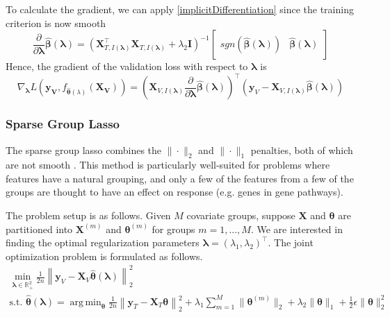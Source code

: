 \documentclass{statsoc}
\DeclareMathOperator*{\argmin}{arg\,min}
\begin{document}
To calculate the gradient, we can apply \eqref{implicitDifferentiation} since the training criterion is now smooth
\begin{equation}
\frac{\partial}{\partial \boldsymbol \lambda} \hat{\boldsymbol{\beta}}(\boldsymbol{\lambda}) = 
\left ( 
\boldsymbol{X}_{T, I(\boldsymbol\lambda)}^\top \boldsymbol{X}_{T, I(\boldsymbol\lambda)} + \lambda_2 \boldsymbol{I}
\right )^{-1}
\begin{bmatrix}
sgn \left (\hat{\boldsymbol{\beta}} (\boldsymbol{\lambda}) \right ) &
\hat{\boldsymbol{\beta}} (\boldsymbol{\lambda})
\end{bmatrix}
\end{equation}
Hence, the gradient of the validation loss with respect to $\boldsymbol{\lambda}$ is
\begin{equation}
\nabla_{\boldsymbol \lambda} L(\boldsymbol{y_V}, f_{\hat{\boldsymbol{\theta}}(\lambda)}(\boldsymbol{X_V})) =
\left (
\boldsymbol{X}_{V, I(\boldsymbol\lambda)}
\frac{\partial}{\partial \boldsymbol \lambda} \hat{\boldsymbol{\beta}}(\boldsymbol{\lambda})
\right )^{\top}
\left (
\boldsymbol y_V - \boldsymbol{X}_{V, I(\boldsymbol\lambda)} \hat{\boldsymbol{\beta}} (\boldsymbol{\lambda})
\right )
\end{equation}

\subsubsection{Sparse Group Lasso}\label{sec:sgl}

The sparse group lasso combines the $\|\cdot\|_2$ and $\|\cdot\|_1$ penalties, both of which are not smooth \citep{simon2013sparse}. This method is particularly well-suited for problems where features have a natural grouping, and only a few of the features from a few of the groups are thought to have an effect on response (e.g. genes in gene pathways).

The problem setup is as follows. Given $M$ covariate groups, suppose $\boldsymbol{X}$ and $\boldsymbol \theta$ are partitioned into $\boldsymbol{X}^{(m)}$ and $\boldsymbol \theta^{(m)}$ for groups $m = 1, ... , M$. We are interested in finding the optimal regularization parameters $\boldsymbol{\lambda} = (\lambda_1, \lambda_2)^\top$. The joint optimization problem is formulated as follows.
\begin{equation}
\begin{array}{c}
\min_{\boldsymbol{\lambda} \in \mathbb{R}^2_{+}} \frac{1}{2n}
\left \| \boldsymbol{y}_V - \boldsymbol{X}_V \hat{\boldsymbol{\theta}}(\boldsymbol{\lambda}) \right \|^2_2 \\
\text{s.t. }
\hat{\boldsymbol{\theta}}(\boldsymbol{\lambda}) =
\argmin_{\boldsymbol{\theta}} \frac{1}{2n} 
\left \| \boldsymbol{y}_T - \boldsymbol{X}_T \boldsymbol{\theta} \right \|^2_2
+ \lambda_1 \sum_{m=1}^M \| \boldsymbol\theta^{(m)} \|_2
+ \lambda_2 \| \boldsymbol\theta \|_1
+ \frac{1}{2} \epsilon \| \boldsymbol\theta \|_2^2
\end{array}
\end{equation}
\end{document}
